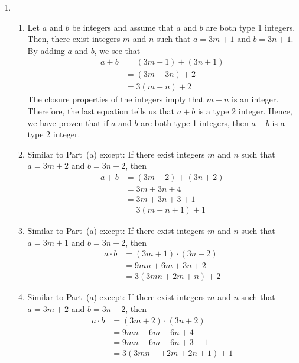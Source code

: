 \begin{enumerate}
\item \begin{enumerate} 
\item Let $a$ and $b$ be integers and assume that $a$ and $b$ are both type 1 integers.  Then, there exist integers $m$ and $n$ such that $a = 3m + 1$ and $b = 3n + 1$.  By adding $a$ and 
$b$, we see that
\[
\begin{aligned}
a + b &= \left( 3m + 1 \right) + \left( 3n + 1 \right) \\
      &= \left( 3m + 3n \right) + 2 \\
      &= 3 \left( m + n \right) + 2
\end{aligned}
\]
The closure properties of the integers imply that $m + n$ is an integer.  Therefore, the last equation tells us that $a + b$ is a type 2 integer.  Hence, we have proven that if $a$ and $b$ are both type 1 integers, then $a + b$ is a type 2 integer.

\item Similar to Part~(a) except:   If there exist integers $m$ and $n$ such that $a = 3m + 2$ and $b = 3n + 2$, then
\[
\begin{aligned}
a + b &= \left( 3m + 2 \right) + \left( 3n + 2 \right) \\
      &= 3m + 3n + 4 \\
      &= 3m + 3n + 3 + 1 \\
      &= 3 \left( m + n + 1 \right) + 1
\end{aligned}
\]

\item Similar to Part~(a) except:   If there exist integers $m$ and $n$ such that $a = 3m + 1$ and $b = 3n + 2$, then
\[
\begin{aligned}
a \cdot b &= \left( 3m + 1 \right) \cdot \left( 3n + 2 \right) \\
      &= 9mn + 6m + 3n + 2 \\
      &= 3 \left( 3mn + 2m + n \right) + 2
\end{aligned}
\]

\item Similar to Part~(a) except:   If there exist integers $m$ and $n$ such that $a = 3m + 2$ and $b = 3n + 2$, then
\[
\begin{aligned}
a \cdot b &= \left( 3m + 2 \right) \cdot \left( 3n + 2 \right) \\
      &= 9mn + 6m + 6n + 4 \\
      &= 9mn + 6m + 6n + 3 + 1 \\
      &= 3 \left( 3mn + + 2m + 2n + 1 \right) + 1
\end{aligned}
\]
\end{enumerate}
\end{enumerate}


